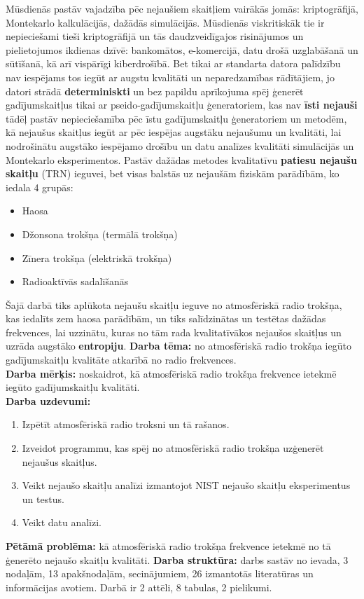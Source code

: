\documentclass[12pt]{article}
\begin{document}
	   Mūsdienās pastāv vajadzība pēc nejaušiem skaitļiem vairākās jomās: kriptogrāfijā, Montekarlo kalkulācijās, dažādās simulācijās.
       Mūsdienās viskritiskāk tie ir nepieciešami tieši kriptogrāfijā un tās daudzveidīgajos risinājumos un pielietojumos ikdienas dzīvē:
       bankomātos, e-komercijā, datu drošā uzglabāšanā un sūtīšanā, kā arī vispārīgi kiberdrošībā.
       Bet tikai ar standarta datora palīdzību nav iespējams tos iegūt ar augstu kvalitāti un neparedzamības rādītājiem, jo datori strādā  
       \textbf{determiniskti} un bez papildu aprīkojuma spēj ģenerēt gadījumskaitļus tikai ar pseido-gadījumskaitļu ģeneratoriem, kas nav \textbf{īsti nejauši} tādēļ pastāv nepieciešamība pēc īstu gadījumskaitļu ģeneratoriem un metodēm, kā nejaušus skaitļus iegūt ar pēc iespējas augstāku nejaušumu un kvalitāti, lai nodrošinātu augstāko iespējamo drošību un datu analīzes kvalitāti simulācijās un Montekarlo eksperimentos. 
       Pastāv dažādas metodes kvalitatīvu \textbf{patiesu nejaušu skaitļu} (TRN) ieguvei, bet visas balstās uz nejaušām fiziskām parādībām,  
       ko \parencite{patiesinejausie}
       iedala 4 grupās: 
       \begin{itemize}
            \item Haosa
            \item Džonsona trokšņa (termālā trokšņa)
            \item Zīnera trokšņa (elektriskā trokšņa)
            \item Radioaktīvās sadalīšanās
       \end{itemize} 
       Šajā darbā tiks aplūkota nejaušu skaitļu ieguve no atmosfēriskā radio trokšņa, kas iedalīts zem haosa parādībām, un tiks salīdzinātas un testētas dažādas frekvences, lai uzzinātu, kuras no tām rada kvalitatīvākos nejaušos skaitļus un uzrāda augstāko \textbf{entropiju}.    
       \textbf{Darba tēma:} no atmosfēriskā radio trokšņa iegūto gadījumskaitļu kvalitāte atkarībā no radio frekvences.\\
       \textbf{Darba mērķis:} noskaidrot, kā atmosfēriskā radio trokšņa frekvence ietekmē iegūto gadījumskaitļu kvalitāti.
       \\
       \textbf{Darba uzdevumi:} 
       \begin{enumerate}
           \item Izpētīt atmosfēriskā radio troksni un tā rašanos.
           \item Izveidot programmu, kas spēj no atmosfēriskā radio trokšņa uzģenerēt nejaušus skaitļus.
           \item Veikt nejaušo skaitļu analīzi izmantojot NIST nejaušo skaitļu eksperimentus un testus.
           \item Veikt datu analīzi.
       \end{enumerate}
       \textbf{Pētāmā problēma:} kā atmosfēriskā radio trokšņa frekvence ietekmē no tā ģenerēto nejaušo skaitļu kvalitāti.
       \textbf{Darba struktūra:} darbs sastāv no ievada, 3 nodaļām, 13 apakšnodaļām, secinājumiem, 26 izmantotās literatūras un informācijas avotiem. Darbā ir 2 attēli, 8 tabulas, 2 pielikumi.
       
\end{document}
